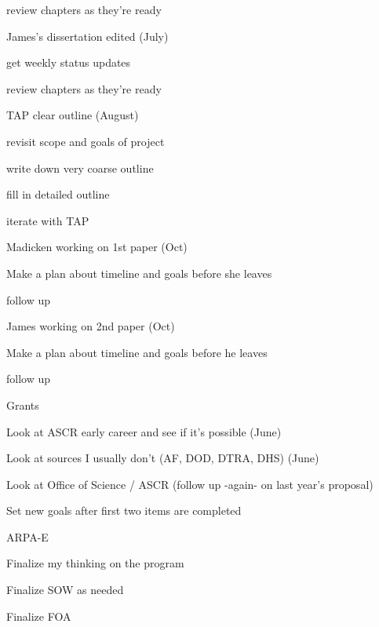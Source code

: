 \documentclass[12pt,twoside]{article}
\begin{document}
\begin{compactitem}
\begin{compactitem}
\begin{compactitem}
     \item review chapters as they're ready
     \end{compactitem}
  \item James's dissertation edited (July)
     \begin{compactitem}
     \item get weekly status updates
     \item review chapters as they're ready
     \end{compactitem}
  \item TAP clear outline (August)
     \begin{compactitem}
     \item revisit scope and goals of project
     \item write down very coarse outline
     \item fill in detailed outline
     \item iterate with TAP
     \end{compactitem}
  \item Madicken working on 1st paper (Oct)
     \begin{compactitem}
     \item Make a plan about timeline and goals before she leaves
     \item follow up
     \end{compactitem}
  \item James working on 2nd paper (Oct)
     \begin{compactitem}
     \item Make a plan about timeline and goals before he leaves
     \item follow up
     \end{compactitem}
  \end{compactitem}

\item Grants
  \begin{compactitem}
  \item Look at ASCR early career and see if it's possible (June)
  \item Look at sources I usually don't (AF, DOD, DTRA, DHS) (June)
  \item Look at Office of Science / ASCR (follow up -again- on last year's proposal)
  \item Set new goals after first two items are completed
  \end{compactitem}
 
\item ARPA-E
  \begin{compactitem}
  \item Finalize my thinking on the program
  \item Finalize SOW as needed
  \item Finalize FOA
  \end{compactitem}
\end{compactitem}
\end{document}
